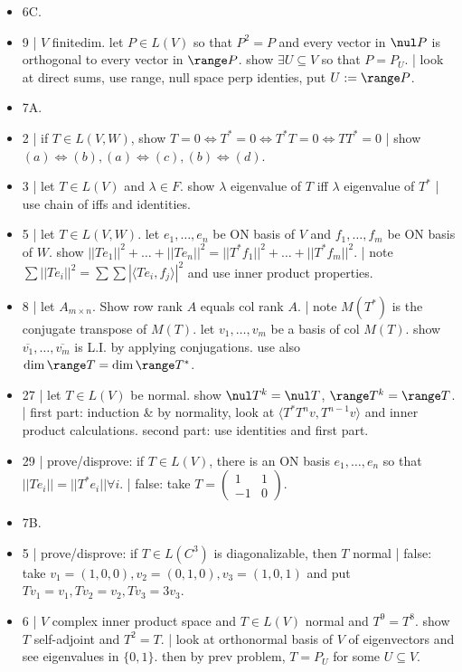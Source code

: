 \begin{itemize}
	\item 6C. 
	\item 9 | $V$ finitedim. let $P \in L(V)$ so that $P^2=P$ and every vector in $\nul P$ is orthogonal to every vector in $\range P$. show $\exists U \subseteq V$ so that $P=P_U$. | look at direct sums, use range, null space perp identies, put $U:= \range P$. 
	\item 7A. 
	\item 2 | if $T \in L(V,W)$, show $T=0 \iff T^*=0 \iff T^*T=0 \iff TT^*=0$ | show $(a) \iff (b), (a) \iff (c), (b) \iff (d)$. 
	\item 3 | let $T \in L(V)$ and $\lambda \in F$. show $\lambda$ eigenvalue of $T$ iff $\lambda$ eigenvalue of $T^*$ | use chain of iffs and identities. 
	\item 5 | let $T \in L(V,W)$. let $e_1,\dots,e_n$ be ON basis of $V$ and $f_1,\dots,f_m$ be ON basis of $W$. show $||Te_1||^2 + \dots + ||Te_n||^2 = ||T^*f_1||^2 + \dots + ||T^*f_m||^2$. | note $\sum ||Te_i||^2 = \sum \sum |\langle Te_i,f_j \rangle|^2$ and use inner product properties. 
	\item 8 | let $A_{m \times n}$. Show row rank $A$ equals col rank $A$. | note $M(T^*)$ is the conjugate transpose of $M(T)$. let $v_1,\dots,v_m$ be a basis of col $M(T)$. show $\overline{v_1},\dots,\overline{v_m}$ is L.I. by applying conjugations. use also $\dim\range T = \dim\range T^*$. 
	\item 27 | let $T \in L(V)$ be normal. show $\nul T^k = \nul T$, $\range T^k = \range T$. | first part: induction \& by normality, look at $\langle T^*T^n v, T^{n-1}v \rangle$ and inner product calculations. second part: use identities and first part. 
	\item 29 | prove/disprove: if $T \in L(V)$, there is an ON basis $e_1,\dots,e_n$ so that $||Te_i|| = ||T^*e_i|| \forall i$. | false: take $T = \begin{pmatrix} 1 & 1 \\ -1 & 0 \end{pmatrix}$. 
	\item 7B. 
	\item 5 | prove/disprove: if $T \in L(C^3)$ is diagonalizable, then $T$ normal | false: take $v_1 = (1,0,0), v_2 = (0,1,0), v_3 = (1,0,1)$ and put $Tv_1 = v_1, Tv_2 = v_2, Tv_3 = 3v_3$. 
	\item 6 | $V$ complex inner product space and $T \in L(V)$ normal and $T^9=T^8$. show $T$ self-adjoint and $T^2=T$. | look at orthonormal basis of $V$ of eigenvectors and see eigenvalues in $\{0,1\}$. then by prev problem, $T=P_U$ for some $U \subseteq V$. 

\end{itemize}
